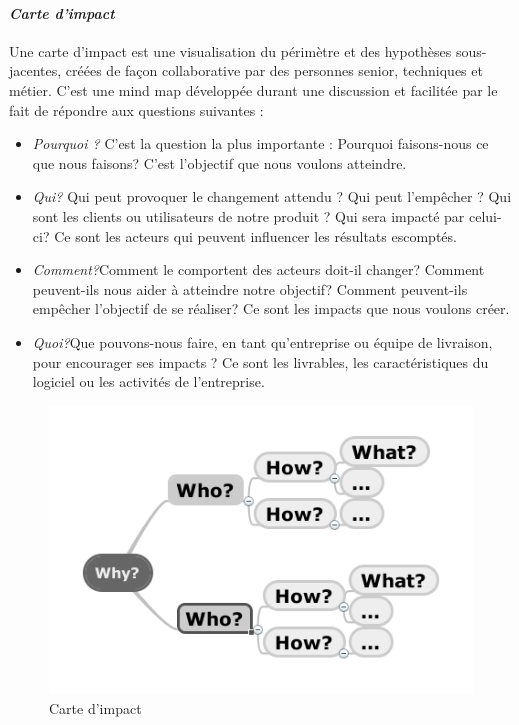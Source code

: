 	\paragraph{\emph{Carte d'impact}\\}
Une carte d'impact est une visualisation du périmètre et des hypothèses sous-jacentes, créées de façon collaborative par des personnes senior, techniques et métier.
C'est une mind map développée durant une discussion et facilitée par le fait de répondre aux questions suivantes :
		\begin{itemize}
			\item \emph{Pourquoi ?} C'est la question la plus importante : Pourquoi faisons-nous ce que nous faisons? C'est l'objectif que nous voulons atteindre.
			\item \emph{Qui?}
Qui peut provoquer le changement attendu ? Qui peut l'empêcher ? Qui sont les clients ou utilisateurs de notre produit ? Qui sera impacté par celui-ci? Ce sont les acteurs qui peuvent influencer les résultats escomptés.
			\item \emph{Comment?}Comment le comportent des acteurs doit-il changer? Comment peuvent-ils nous aider à atteindre notre objectif? Comment peuvent-ils empêcher l'objectif de se réaliser? Ce sont les impacts que nous voulons créer.
			\item \emph{Quoi?}Que pouvons-nous faire, en tant qu'entreprise ou équipe de livraison, pour encourager ses impacts ? Ce sont les livrables, les caractéristiques du logiciel ou les activités de l'entreprise.
	\end{itemize}
\begin{figure}[htbp]
	\centering
	\includegraphics[scale=0.6]{images/impact_map.png}
	\caption{Carte d'impact}
	\label{impact_map}
\end{figure}